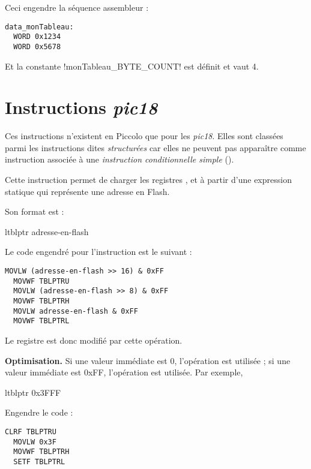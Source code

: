 Ceci engendre la séquence assembleur :

\begin{lstlisting}[language=assembleur]
data_monTableau:
  WORD 0x1234
  WORD 0x5678
\end{lstlisting}

Et la constante \pic!monTableau_BYTE_COUNT! est définit et vaut 4.



\section{Instructions \emph{pic18}}

Ces instructions n'existent en Piccolo que pour les \emph{pic18}. Elles sont classées parmi les instructions dites \emph{structurées} car elles ne peuvent pas apparaître comme instruction associée à une \emph{instruction conditionnelle simple} ().




Cette instruction permet de charger les registres ,  et  à partir d'une expression statique qui représente une adresse en Flash.

Son format est :
\begin{piccolo}
  ltblptr adresse-en-flash
\end{piccolo}

Le code engendré pour l'instruction est le suivant :
\begin{lstlisting}[language=assembleur]
  MOVLW (adresse-en-flash >> 16) & 0xFF
  MOVWF TBLPTRU
  MOVLW (adresse-en-flash >> 8) & 0xFF
  MOVWF TBLPTRH
  MOVLW adresse-en-flash & 0xFF
  MOVWF TBLPTRL
\end{lstlisting}

Le registre  est donc modifié par cette opération.

\textbf{Optimisation.} Si une valeur immédiate est 0, l'opération  est utilisée ; si une valeur immédiate est 0xFF, l'opération  est utilisée. Par exemple, 
\begin{piccolo}
  ltblptr 0x3FFF
\end{piccolo}

Engendre le code :
\begin{lstlisting}[language=assembleur]
  CLRF TBLPTRU
  MOVLW 0x3F
  MOVWF TBLPTRH
  SETF TBLPTRL
\end{lstlisting}



